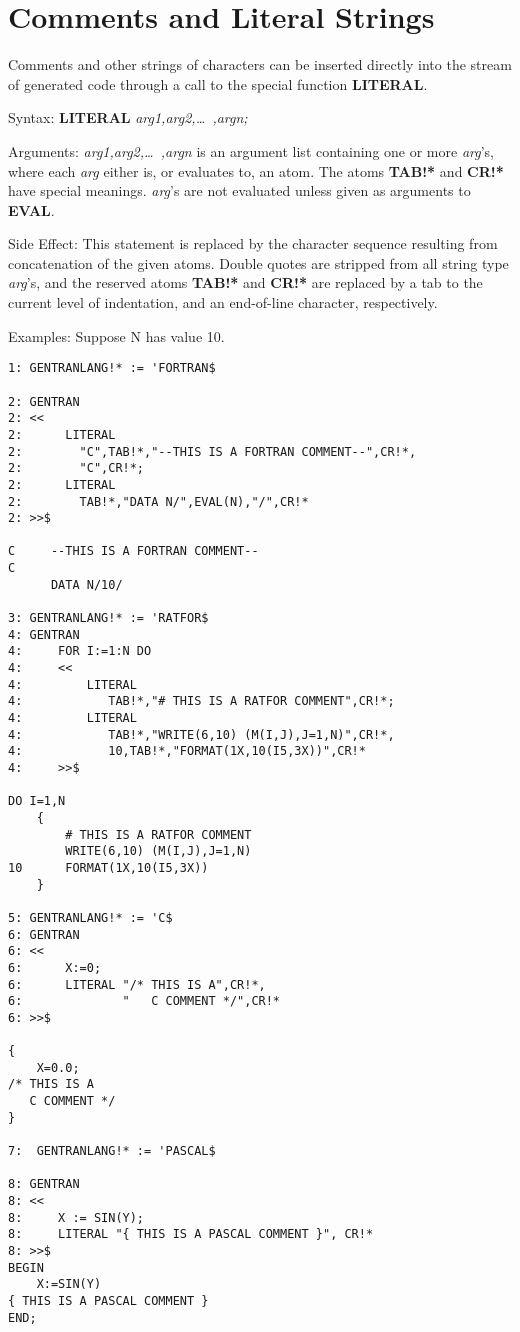 \section{Comments and Literal Strings}
\label{comments}
Comments and other strings of characters can be inserted directly into
the stream of generated code through a call to the special function
{\bf LITERAL}.
\begin{describe}{Syntax:}
{\bf LITERAL} {\it  arg1,arg2,\dots\  ,argn;}
\end{describe}
\begin{describe}{Arguments:}
{\it arg1,arg2,\dots\  ,argn} is an argument list containing one or more
{\it arg}'s, where each {\it arg} either is, or evaluates to, an atom.  The
atoms {\bf TAB!*} and {\bf CR!*} have special meanings.  {\it arg}'s are
not evaluated unless given as arguments to {\bf EVAL}.
\end{describe}
\begin{describe}{Side Effect:}
This statement is replaced by the character sequence resulting from
concatenation of the given atoms.  Double quotes are stripped from
all string type {\it arg}'s, and the reserved atoms {\bf TAB!*} and
{\bf CR!*} are replaced by a tab to the current level of indentation, and
an end-of-line character, respectively.
\end{describe}
\begin{describe}{Examples:}
Suppose N has value 10.
\begin{verbatim}
1: GENTRANLANG!* := 'FORTRAN$ 

2: GENTRAN 
2: << 
2:      LITERAL 
2:        "C",TAB!*,"--THIS IS A FORTRAN COMMENT--",CR!*, 
2:        "C",CR!*; 
2:      LITERAL 
2:        TAB!*,"DATA N/",EVAL(N),"/",CR!* 
2: >>$ 

C     --THIS IS A FORTRAN COMMENT--
C
      DATA N/10/

3: GENTRANLANG!* := 'RATFOR$ 
4: GENTRAN 
4:     FOR I:=1:N DO 
4:     << 
4:         LITERAL 
4:            TAB!*,"# THIS IS A RATFOR COMMENT",CR!*; 
4:         LITERAL 
4:            TAB!*,"WRITE(6,10) (M(I,J),J=1,N)",CR!*, 
4:            10,TAB!*,"FORMAT(1X,10(I5,3X))",CR!* 
4:     >>$ 

DO I=1,N
    {
        # THIS IS A RATFOR COMMENT
        WRITE(6,10) (M(I,J),J=1,N)
10      FORMAT(1X,10(I5,3X))
    }

5: GENTRANLANG!* := 'C$ 
6: GENTRAN 
6: << 
6:      X:=0; 
6:      LITERAL "/* THIS IS A",CR!*, 
6:              "   C COMMENT */",CR!* 
6: >>$ 

{
    X=0.0;
/* THIS IS A
   C COMMENT */
}

7:  GENTRANLANG!* := 'PASCAL$

8: GENTRAN
8: <<
8:     X := SIN(Y);
8:     LITERAL "{ THIS IS A PASCAL COMMENT }", CR!*
8: >>$
BEGIN
    X:=SIN(Y)
{ THIS IS A PASCAL COMMENT }
END;

\end{verbatim}
\end{describe}
